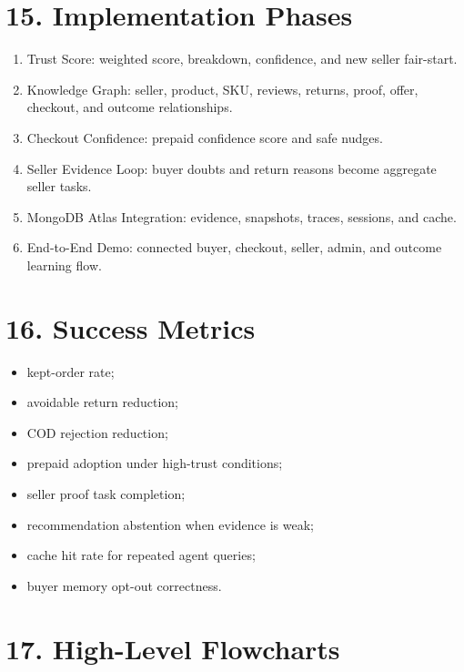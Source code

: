 \documentclass[11pt,a4paper,landscape]{article}
\begin{document}
\section{15. Implementation Phases}
\begin{enumerate}
  \item Trust Score: weighted score, breakdown, confidence, and new seller fair-start.
  \item Knowledge Graph: seller, product, SKU, reviews, returns, proof, offer, checkout, and outcome relationships.
  \item Checkout Confidence: prepaid confidence score and safe nudges.
  \item Seller Evidence Loop: buyer doubts and return reasons become aggregate seller tasks.
  \item MongoDB Atlas Integration: evidence, snapshots, traces, sessions, and cache.
  \item End-to-End Demo: connected buyer, checkout, seller, admin, and outcome learning flow.
\end{enumerate}

\section{16. Success Metrics}
\begin{itemize}
  \item kept-order rate;
  \item avoidable return reduction;
  \item COD rejection reduction;
  \item prepaid adoption under high-trust conditions;
  \item seller proof task completion;
  \item recommendation abstention when evidence is weak;
  \item cache hit rate for repeated agent queries;
  \item buyer memory opt-out correctness.
\end{itemize}

\newpage
\section{17. High-Level Flowcharts}
\end{document}
